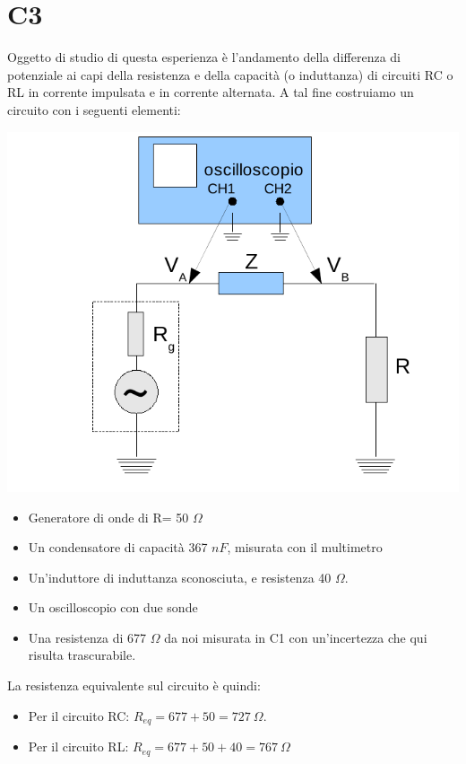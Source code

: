 \chapter{C3}
Oggetto di studio di questa esperienza è l'andamento della differenza di potenziale ai capi della resistenza e della capacità (o induttanza) di circuiti RC o RL in corrente impulsata e in corrente alternata.
A tal fine costruiamo un circuito con i seguenti elementi:

\begin{center}
 \includegraphics[scale=0.70]{grafici/C3/schema.png}
\end{center}

\begin{itemize}
  \item Generatore di onde di R= 50 $\Omega$
  \item Un condensatore di capacità 367 $nF$, misurata con il multimetro
  \item Un'induttore di induttanza sconosciuta, e resistenza 40 $\Omega$.
  \item Un oscilloscopio con due sonde
  \item Una resistenza di 677 $\Omega$ da noi misurata in C1 con un'incertezza che qui risulta trascurabile. 
\end{itemize}
La resistenza equivalente sul circuito è quindi:
\begin{itemize}
 \item Per il circuito RC: $R_{eq} = 677+50 = 727\ \Omega$.
 \item Per il circuito RL: $R_{eq} = 677+50+40 = 767\ \Omega$
\end{itemize}

